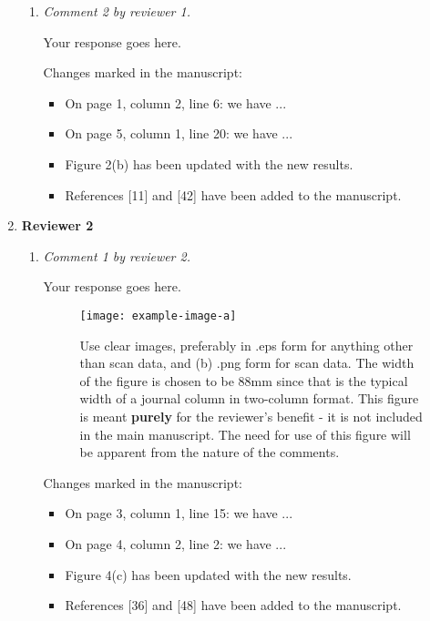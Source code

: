 \documentclass[12pt]{article}
\begin{document}
\begin{enumerate}
\begin{enumerate}
  \item \textit{Comment 2 by reviewer 1.}
    
    Your response goes here.
    
    Changes marked in the manuscript:
    
    \begin{itemize}
    \item On page 1, column 2, line 6: we have ...
    \item On page 5, column 1, line 20: we have ...
    \item Figure 2(b) has been updated with the new results.
    \item References [11] and [42] have been added to the manuscript.
    \end{itemize}
  \end{enumerate}
  
\item \textbf{Reviewer 2} %
  \begin{enumerate}
  \item \textit{Comment 1 by reviewer 2.}
    
    Your response goes here.

    \begin{figure}
      \centering
      \texttt{[image: example-image-a]}
      \caption{Use clear images, preferably in .eps form for anything other than scan data, and (b) .png form for scan data. The width of the figure is chosen to be 88mm since that is the typical width of a journal column in two-column format. This figure is meant \textbf{purely} for the reviewer's benefit - it is not included in the main manuscript. The need for use of this figure will be apparent from the nature of the comments.}
      \label{fig:cv}
    \end{figure}
    
    Changes marked in the manuscript:
    
    \begin{itemize}
    \item On page 3, column 1, line 15: we have ...
    \item On page 4, column 2, line 2: we have ...
    \item Figure 4(c) has been updated with the new results.
    \item References [36] and [48] have been added to the manuscript.
    \end{itemize}
    

\end{enumerate}
\end{enumerate}
\end{document}
